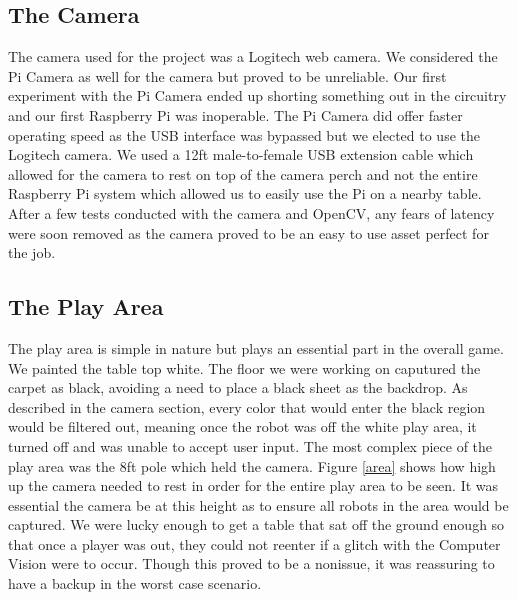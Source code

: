 \documentclass[11pt]{ieeeconf}
\begin{document}
\subsection{The Camera}

The camera used for the project was a Logitech web camera. We considered the Pi Camera as well for the camera but proved to be unreliable. Our first experiment with the Pi Camera ended up shorting something out in the circuitry and our first Raspberry Pi was inoperable. The Pi Camera did offer faster operating speed as the USB interface was bypassed but we elected to use the Logitech camera. We used a 12ft male-to-female USB extension cable which allowed for the camera to rest on top of the camera perch and not the entire Raspberry Pi system which allowed us to easily use the Pi on a nearby table. After a few tests conducted with the camera and OpenCV, any fears of latency were soon removed as the camera proved to be an easy to use asset perfect for the job.  

\subsection{The Play Area}

The play area is simple in nature but plays an essential part in the overall game. We painted the table top white. The floor we were working on caputured the carpet as black, avoiding a need to place a black sheet as the backdrop. As described in the camera section, every color that would enter the black region would be filtered out, meaning once the robot was off the white play area, it turned off and was unable to accept user input. The most complex piece of the play area was the 8ft pole which held the camera. Figure \ref{area} shows how high up the camera needed to rest in order for the entire play area to be seen. It was essential the camera be at this height as to ensure all robots in the area would be captured. We were lucky enough to get a table that sat off the ground enough so that once a player was out, they could not reenter if a glitch with the Computer Vision were to occur. Though this proved to be a nonissue, it was reassuring to have a backup in the worst case scenario. 
\end{document}
